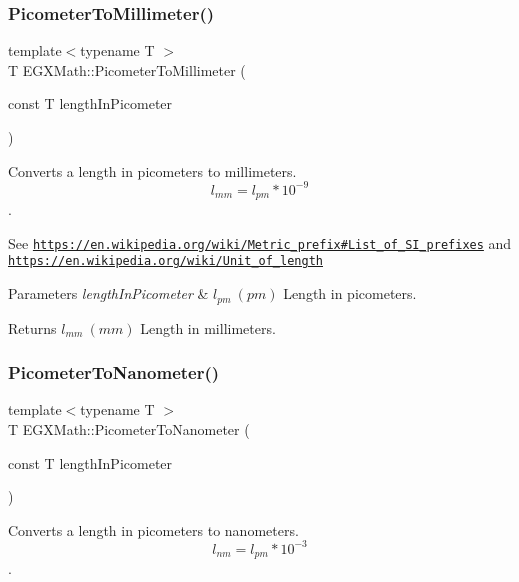 \subsubsection{\texorpdfstring{Picometer\+To\+Millimeter()}{PicometerToMillimeter()}}
{\footnotesize\ttfamily template$<$typename T $>$ \\
T E\+G\+X\+Math\+::\+Picometer\+To\+Millimeter (\begin{DoxyParamCaption}\item[{const T}]{length\+In\+Picometer }\end{DoxyParamCaption})}



Converts a length in picometers to millimeters. \[ l_{mm}=l_{pm} * 10^{-9} \]. 

See \href{https://en.wikipedia.org/wiki/Metric_prefix#List_of_SI_prefixes}{\tt https\+://en.\+wikipedia.\+org/wiki/\+Metric\+\_\+prefix\#\+List\+\_\+of\+\_\+\+S\+I\+\_\+prefixes} and \href{https://en.wikipedia.org/wiki/Unit_of_length}{\tt https\+://en.\+wikipedia.\+org/wiki/\+Unit\+\_\+of\+\_\+length} 
\begin{DoxyParams}{Parameters}
{\em length\+In\+Picometer} & $ l_{pm}\ (pm)$ Length in picometers. \\
\hline
\end{DoxyParams}
\begin{DoxyReturn}{Returns}
$ l_{mm}\ (mm)$ Length in millimeters. 
\end{DoxyReturn}
\mbox{\label{group___e_g_x_math-_conversions-_length_conversions-_s_i-_picometer-_s_i_gace426a434c0521d391fd15260e33d9f0}} 
\subsubsection{\texorpdfstring{Picometer\+To\+Nanometer()}{PicometerToNanometer()}}
{\footnotesize\ttfamily template$<$typename T $>$ \\
T E\+G\+X\+Math\+::\+Picometer\+To\+Nanometer (\begin{DoxyParamCaption}\item[{const T}]{length\+In\+Picometer }\end{DoxyParamCaption})}



Converts a length in picometers to nanometers. \[ l_{nm}=l_{pm} * 10^{-3} \]. 

